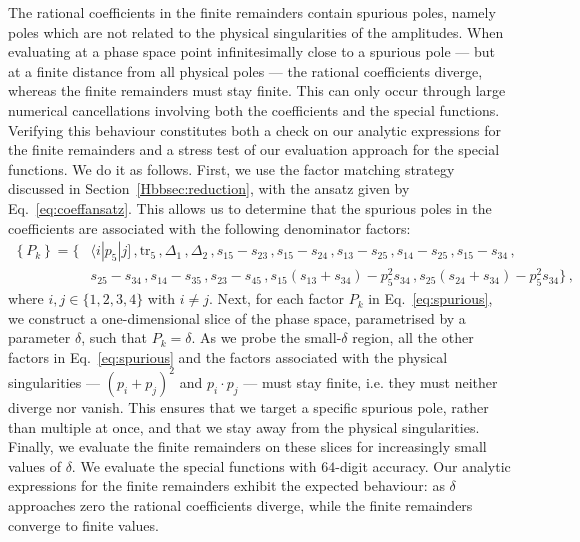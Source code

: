 \documentclass[main.tex]{subfiles}
\begin{document}
The rational coefficients in the finite remainders contain spurious poles, namely poles which are not related to the physical singularities of the amplitudes. When evaluating at a phase space point infinitesimally close to a spurious pole --- but at a finite distance from all physical poles --- the rational coefficients diverge, whereas the finite remainders must stay finite. This can only occur through large numerical cancellations involving both the coefficients and the special functions. Verifying this behaviour constitutes both a check on our analytic expressions for the finite remainders and a stress test of our evaluation approach for the special functions. We do it as follows.
First, we use the factor matching strategy discussed in Section~\ref{Hbbsec:reduction}, with the ansatz given by Eq.~\ref{eq:coeffansatz}. This allows us to determine that the spurious poles in the coefficients are associated with the following denominator factors:
\begin{equation} \label{eq:spurious}
\begin{aligned}
\left\{P_k \right\} = \biggl\{ & \langle i | p_{5}| j] \,, \text{tr}_5 \,, \Delta_1 \,, \Delta_2 \,, s_{15} - s_{23} \,, s_{15} - s_{24} \,, s_{13} - s_{25} \,, s_{14} - s_{25} \,, s_{15} - s_{34} \,,  \\
  &  s_{25} - s_{34} \,, s_{14} - s_{35} \,, s_{23} - s_{45} \,,
 s_{15} (s_{13}+s_{34}) - p_5^2  s_{34}  \,,
 s_{25} (s_{24}+s_{34}) - p_5^2  s_{34} \biggr\} \,,
\end{aligned}
\end{equation}
where $i,j \in \{1,2,3,4\}$ with $i\neq j$. Next, for each factor $P_k$ in Eq.~\ref{eq:spurious}, we construct a one-dimensional slice of the phase space, parametrised by a parameter $\delta$, such that $P_k = \delta$. As we probe the small-$\delta$ region, all the other factors in Eq.~\ref{eq:spurious} and the factors associated with the physical singularities --- $(p_i+p_j)^2$ and $p_i \cdot p_j$ --- must stay finite, i.e. they must neither diverge nor vanish. This ensures that we target a specific spurious pole, rather than multiple at once, and that we stay away from the physical singularities. Finally, we evaluate the finite remainders on these slices for increasingly small values of $\delta$. We evaluate the special functions with $64$-digit accuracy. Our analytic expressions for the finite remainders exhibit the expected behaviour: as $\delta$ approaches zero the rational coefficients diverge, while the finite remainders converge to finite values. 
\end{document}
